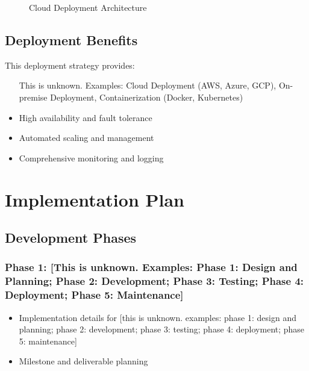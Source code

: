\documentclass[11pt,a4paper,oneside]{article}
\begin{document}
\begin{figure}[H]
\caption{Cloud Deployment Architecture}
\label{fig:deployment}
\end{figure}


\subsection{Deployment Benefits}

This deployment strategy provides:
\begin{itemize}
\item [This is unknown. Examples: Cloud Deployment (AWS, Azure, GCP), On-premise Deployment, Containerization (Docker, Kubernetes)]
\item High availability and fault tolerance
\item Automated scaling and management
\item Comprehensive monitoring and logging
\end{itemize}

\section{Implementation Plan}

\subsection{Development Phases}

\subsubsection{Phase 1: [This is unknown. Examples: Phase 1: Design and Planning; Phase 2: Development; Phase 3: Testing; Phase 4: Deployment; Phase 5: Maintenance]}
\begin{itemize}
\item Implementation details for [this is unknown. examples: phase 1: design and planning; phase 2: development; phase 3: testing; phase 4: deployment; phase 5: maintenance]
\item Milestone and deliverable planning
\end{itemize}
\end{document}
